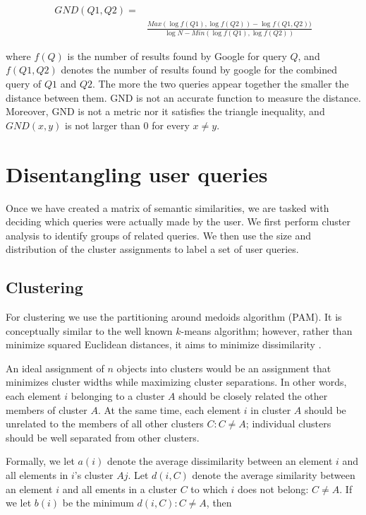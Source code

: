 \documentclass[11pt]{article}
\begin{document}
\begin{multicols}{2}
\begin{eqnarray}
\label{eq:gnd}
GND(Q1, Q2) =& \nonumber \\
&\frac{Max(\log f(Q1), \log f(Q2))-\log f(Q1, Q2))}{\log N - Min(\log f(Q1), \log f(Q2))}
\end{eqnarray}

where $f(Q)$ is the number of results found by Google for query $Q$, and $f(Q1, Q2)$ denotes the number of results found by google for the combined query of $Q1$ and $Q2$.
The more the two queries appear together the smaller the distance between them. GND is not an accurate function to measure the distance\cite{DBLP:GND}. Moreover, GND is not a metric nor it satisfies the triangle inequality, and $GND(x, y)$ is not larger than 0 for every $x \neq y$. 



\section{Disentangling user queries}
\label{sec:disentangle}
Once we have created a matrix of semantic similarities, we are tasked
with deciding which queries were actually made by the user. We first
perform cluster analysis to identify groups of related queries. We
then use the size and distribution of the cluster assignments to label a
set of user queries.

\subsection{Clustering}
\label{sec:clustering}
For clustering we use the partitioning around medoids algorithm
(PAM). It is conceptually similar to the well known $k$-means
algorithm; however, rather than minimize squared Euclidean distances,
it aims to minimize dissimilarity \cite{Kaufmann1990}. 

An ideal assignment of $n$ objects into clusters would be an assignment that minimizes cluster widths while maximizing cluster separations. In other words, each element $i$ belonging to a cluster $A$ should be closely related the other members of cluster $A$. At the same time, each element $i$ in cluster $A$ should be unrelated to the members of all other clusters $C : C \neq A$; individual clusters should be well separated from other clusters.

Formally, we let $a(i)$ denote the average dissimilarity between an element $i$ and all elements in $i$'s cluster $Aj$. Let $d(i,C)$ denote the average similarity between an element $i$ and all ements in a cluster $C$ to which $i$ does not belong: $C \neq A$. If we let $b(i)$ be the minimum $d(i,C) : C \neq A$, then


\end{multicols}
\end{document}

